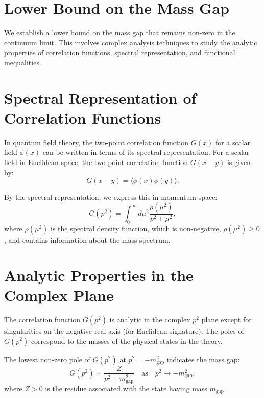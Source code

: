 \section{Lower Bound on the Mass Gap}

We establish a lower bound on the mass gap that remains non-zero in the 
continuum limit. This involves complex analysis techniques to study the analytic 
properties of correlation functions, spectral representation, and functional 
inequalities.



\section{Spectral Representation of Correlation Functions}

In quantum field theory, the two-point correlation function \(G(x)\) for a scalar field \(\phi(x)\) can be written in terms of its spectral representation. For a scalar field in Euclidean space, the two-point correlation function \(G(x - y)\) is given by:
\begin{equation}
G(x - y) = \langle \phi(x) \phi(y) \rangle.
\end{equation}

By the spectral representation, we express this in momentum space:
\begin{equation}
G(p^2) = \int_0^\infty d\mu^2 \frac{\rho(\mu^2)}{p^2 + \mu^2},
\end{equation}
where \(\rho(\mu^2)\) is the spectral density function, which is non-negative, \(\rho(\mu^2) \geq 0\), and contains information about the mass spectrum.



\section{Analytic Properties in the Complex Plane}

The correlation function \(G(p^2)\) is analytic in the complex \(p^2\) plane except for singularities on the negative real axis (for Euclidean signature). The poles of \(G(p^2)\) correspond to the masses of the physical states in the theory.

The lowest non-zero pole of \(G(p^2)\) at \(p^2 = -m_{\text{gap}}^2\) indicates the mass gap:
\begin{equation}
G(p^2) \sim \frac{Z}{p^2 + m_{\text{gap}}^2} \quad \text{as} \quad p^2 \to -m_{\text{gap}}^2,
\end{equation}
where \(Z > 0\) is the residue associated with the state having mass \(m_{\text{gap}}\).



